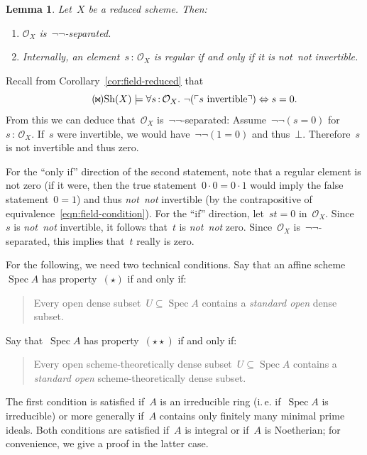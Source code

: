 \documentclass[10pt,reqno,a4paper]{amsbook}
\makeatletter
\theoremstyle{definition}
\theoremstyle{plain}
\newtheorem{lemma}[defn]{Lemma}
\theoremstyle{remark}
\renewcommand{\O}{\mathcal{O}}
\newcommand{\Sh}{\mathrm{Sh}}
\DeclareMathOperator{\Spec}{Spec}
\newcommand{\?}{\,{:}\,}
\renewcommand{\_}{\mathpunct{.}\,}
\newcommand{\speak}[1]{\ulcorner\text{\textnormal{#1}}\urcorner}
\newcommand{\ie}{i.\,e.\@\xspace}
\newcommand{\notnot}{\emph{not~not}\xspace}
\renewenvironment{proof}[1][\proofname]{\par
  \pushQED{\qed}%
  \normalfont \topsep6\p@\@plus6\p@\relax
  \trivlist
  \item[\hskip\labelsep
        \itshape
    #1\@addpunct{.}]\ignorespaces
}{%
  \popQED\endtrivlist\@endpefalse
}
\makeatother
\begin{document}
\begin{lemma}\label{lemma:regular-notnot-invertible}Let~$X$ be a reduced scheme. Then:
\begin{enumerate}
\item $\O_X$ is~$\neg\neg$-separated.
\item Internally, an element~$s\?\O_X$ is regular
if and only if it is \notnot invertible.
\end{enumerate}
\end{lemma}
\begin{proof}Recall from Corollary~\ref{cor:field-reduced} that
\begin{equation}\label{eqn:field-condition}\tag{${\!\Join\!}$}
  \Sh(X) \models \forall s\?\O_X\_ \neg(\speak{$s$ invertible}) \Leftrightarrow
  s=0.
\end{equation}
From this we can deduce that~$\O_X$ is~$\neg\neg$-separated:
Assume~$\neg\neg(s=0)$ for~$s\?\O_X$. If~$s$ were invertible, we would
have~$\neg\neg(1=0)$ and thus~$\bot$. Therefore~$s$ is not invertible and thus
zero.

For the ``only if'' direction of the second statement,
note that a regular element is not zero (if it were, then the true statement~$0
\cdot 0 = 0 \cdot 1$ would imply the false statement~$0 = 1$) and thus \notnot
invertible (by the contrapositive of equivalence~\eqref{eqn:field-condition}). For the ``if''
direction, let~$st = 0$ in~$\O_X$. Since~$s$ is \notnot invertible, it follows
that~$t$ is \notnot zero. Since~$\O_X$ is~$\neg\neg$-separated, this implies
that~$t$ really is zero.
\end{proof}

For the following, we need two technical conditions. Say that an affine
scheme~$\Spec A$ has property~$(\star)$ if and only if:
\begin{quote}
Every open dense subset~$U \subseteq \Spec A$ contains a
\emph{standard open} dense subset.
\end{quote}
Say that~$\Spec A$ has property~$(\star\star)$ if and only if:
\begin{quote}
Every open scheme-theoretically dense subset~$U \subseteq \Spec A$ contains a
\emph{standard open} scheme-theoretically dense subset.
\end{quote}
The first condition is satisfied if~$A$ is an irreducible ring (\ie if~$\Spec A$
is irreducible) or more generally if~$A$ contains only finitely many minimal
prime ideals. Both conditions are satisfied if~$A$ is integral or if~$A$ is
Noetherian; for convenience, we give a proof in the
latter case.
\end{document}
